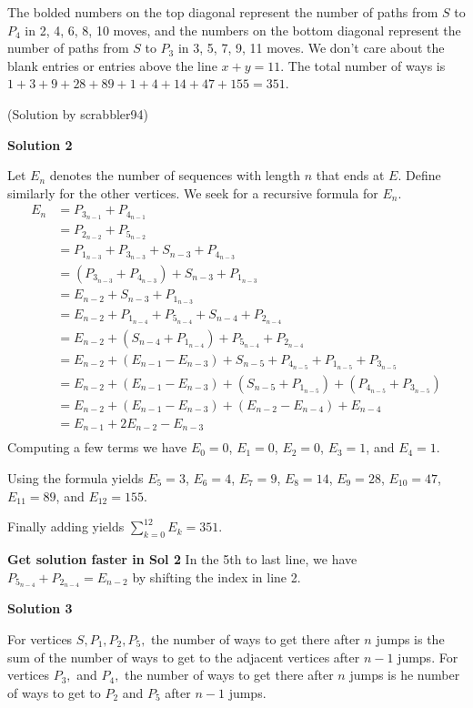 \begin{enumerate}
 The bolded numbers on the top diagonal represent the number of paths from $S$ to $P_4$ in 2, 4, 6, 8, 10 moves, and the numbers on the bottom diagonal represent the number of paths from $S$ to $P_3$ in 3, 5, 7, 9, 11 moves. We don't care about the blank entries or entries above the line $x+y = 11$. The total number of ways is $1+3+9+28+89+1+4+14+47+155 = \boxed{351}$.

 (Solution by scrabbler94)

 



\textbf{Solution 2}

Let $E_n$ denotes the number of sequences with length $n$ that ends at $E$. Define similarly for the other vertices. We seek for a recursive formula for $E_n$.
 \begin{align*} E_n&=P_{3_{n-1}}+P_{4_{n-1}} \\ &=P_{2_{n-2}}+P_{5_{n-2}} \\ &=P_{1_{n-3}}+P_{3_{n-3}}+S_{n-3}+P_{4_{n-3}} \\ &=(P_{3_{n-3}}+P_{4_{n-3}})+S_{n-3}+P_{1_{n-3}} \\ &=E_{n-2}+S_{n-3}+P_{1_{n-3}} \\ &=E_{n-2}+P_{1_{n-4}}+P_{5_{n-4}}+S_{n-4}+P_{2_{n-4}} \\ &=E_{n-2}+(S_{n-4}+P_{1_{n-4}})+P_{5_{n-4}}+P_{2_{n-4}} \\ &=E_{n-2}+(E_{n-1}-E_{n-3})+S_{n-5}+P_{4_{n-5}}+P_{1_{n-5}}+P_{3_{n-5}} \\ &=E_{n-2}+(E_{n-1}-E_{n-3})+(S_{n-5}+P_{1_{n-5}})+(P_{4_{n-5}}+P_{3_{n-5}}) \\ &=E_{n-2}+(E_{n-1}-E_{n-3})+(E_{n-2}-E_{n-4})+E_{n-4} \\ &=E_{n-1}+2E_{n-2}-E_{n-3} \\ \end{align*}
Computing a few terms we have $E_0=0$, $E_1=0$, $E_2=0$, $E_3=1$, and $E_4=1$.

 Using the formula yields $E_5=3$, $E_6=4$, $E_7=9$, $E_8=14$, $E_9=28$, $E_{10}=47$, $E_{11}=89$, and $E_{12}=155$.

 Finally adding yields $\sum_{k=0}^{12}E_k=\boxed{351}$.

 \textbf{Get solution faster in Sol 2} In the 5th to last line, we have $P_{5_{n-4}}+P_{2_{n-4}}=E_{n-2}$ by shifting the index in line 2.

 



\textbf{Solution 3}

For vertices $S, P_1, P_2, P_5,$ the number of ways to get there after $n$ jumps is the sum of the number of ways to get to the adjacent vertices after $n-1$ jumps. For vertices $P_3,$ and $P_4,$ the number of ways to get there after $n$ jumps is he number of ways to get to $P_2$ and $P_5$ after $n-1$ jumps.


\end{enumerate}
